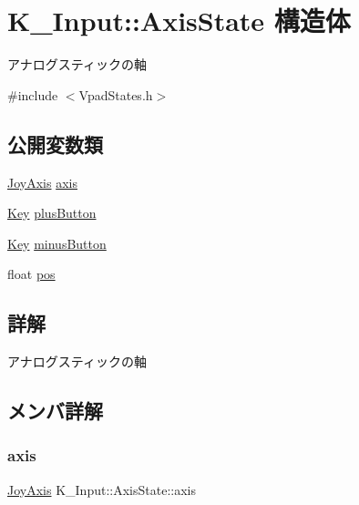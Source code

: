 \hypertarget{struct_k___input_1_1_axis_state}{}\section{K\+\_\+\+Input\+:\+:Axis\+State 構造体}
\label{struct_k___input_1_1_axis_state}


アナログスティックの軸  




{\ttfamily \#include $<$Vpad\+States.\+h$>$}

\subsection*{公開変数類}
\begin{DoxyCompactItemize}
\item 
\mbox{\hyperlink{namespace_k___input_a82230ae06723a21cc710ae3d66fd078f}{Joy\+Axis}} \mbox{\hyperlink{struct_k___input_1_1_axis_state_a253890a432ae112fc57d39f7e06c88ad}{axis}}
\item 
\mbox{\hyperlink{namespace_k___input_af62d80c77b12db01035e4b9aa27a09d6}{Key}} \mbox{\hyperlink{struct_k___input_1_1_axis_state_ad652895e754dfc2be58995677bf97ec6}{plus\+Button}}
\item 
\mbox{\hyperlink{namespace_k___input_af62d80c77b12db01035e4b9aa27a09d6}{Key}} \mbox{\hyperlink{struct_k___input_1_1_axis_state_ad1c843ecba70aa4035dfe71c498b26c1}{minus\+Button}}
\item 
float \mbox{\hyperlink{struct_k___input_1_1_axis_state_ac23cfe9122fca5a53ca24fcacb3f2123}{pos}}
\end{DoxyCompactItemize}


\subsection{詳解}
アナログスティックの軸 

\subsection{メンバ詳解}
\mbox{\label{struct_k___input_1_1_axis_state_a253890a432ae112fc57d39f7e06c88ad}} 
\subsubsection{\texorpdfstring{axis}{axis}}
{\footnotesize\ttfamily \mbox{\hyperlink{namespace_k___input_a82230ae06723a21cc710ae3d66fd078f}{Joy\+Axis}} K\+\_\+\+Input\+::\+Axis\+State\+::axis}

